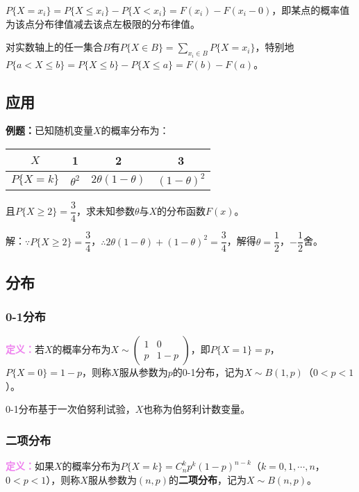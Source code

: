 \documentclass[UTF8, 12pt]{ctexart}
\begin{document}
$P\{X=x_i\}=P\{X\leqslant x_i\}-P\{X<x_i\}=F(x_i)-F(x_i-0)$，即某点的概率值为该点分布律值减去该点左极限的分布律值。

对实数轴上的任一集合$B$有$P\{X\in B\}=\sum\limits_{x_i\in B}P\{X=x_i\}$，特别地$P\{a<X\leqslant b\}=P\{X\leqslant b\}-P\{X\leqslant a\}=F(b)-F(a)$。

\subsection{应用}

\textbf{例题：}已知随机变量$X$的概率分布为：\medskip

\begin{tabular}{c|ccc}
    \hline
    $X$ & 1 & 2 & 3 \\ \hline
    $P\{X=k\}$ & $\theta^2$ & $2\theta(1-\theta)$ & $(1-\theta)^2$ \\
    \hline
\end{tabular} \medskip

且$P\{X\geqslant2\}=\dfrac{3}{4}$，求未知参数$\theta$与$X$的分布函数$F(x)$。

解：$\because P\{X\geqslant2\}=\dfrac{3}{4}$，$\therefore 2\theta(1-\theta)+(1-\theta)^2=\dfrac{3}{4}$，解得$\theta=\dfrac{1}{2}$，$-\dfrac{1}{2}$舍。

\subsection{分布}

\subsubsection{0-1分布}

\textcolor{violet}{\textbf{定义：}}若$X$的概率分布为$X\sim\left(\begin{array}{cc}
    1 & 0 \\
    p & 1-p
\end{array}\right)$，即$P\{X=1\}=p$，$P\{X=0\}=1-p$，则称$X$服从参数为$p$的0-1分布，记为$X\sim B(1,p)$（$0<p<1$）。

0-1分布基于一次伯努利试验，$X$也称为伯努利计数变量。

\subsubsection{二项分布}

\textcolor{violet}{\textbf{定义：}}如果$X$的概率分布为$P\{X=k\}=C_n^kp^k(1-p)^{n-k}$（$k=0,1,\cdots,n$，$0<p<1$），则称$X$服从参数为$(n,p)$的\textbf{二项分布}，记为$X\sim B(n,p)$。
\end{document}
